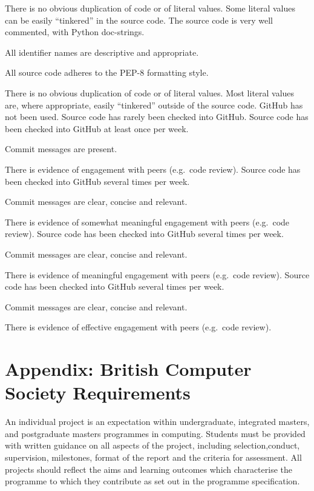 \documentclass{../fal_assignment}
\begin{document}
\begin{markingrubric}
\par There is no obvious duplication of code or of literal values. Some literal values can be easily ``tinkered'' in the source code. 
\grade The source code is very well commented, with Python doc-strings.
\par All identifier names are descriptive and appropriate.
\par All source code adheres to the PEP-8 formatting style.
\par There is no obvious duplication of code or of literal values. Most literal values are, where appropriate, easily ``tinkered'' outside of the source code.  	
		\grade\fail GitHub has not been used.
		\grade Source code has rarely been checked into GitHub.
		\grade Source code  has been checked into GitHub at least once per week.
			\par Commit messages are present.
			\par There is evidence of engagement with peers (e.g.\ code review).
		\grade Source code  has been checked into GitHub several times per week.
			\par Commit messages are clear, concise and relevant.
			\par There is evidence of somewhat meaningful engagement with peers (e.g.\ code review).
		\grade Source code has been checked into GitHub several times per week.
			\par Commit messages are clear, concise and relevant.
			\par There is evidence of meaningful engagement with peers (e.g.\ code review).
		\grade Source code has been checked into GitHub several times per week.
			\par Commit messages are clear, concise and relevant.
			\par There is evidence of effective engagement with peers (e.g.\ code review).
\end{markingrubric}

\section*{Appendix: British Computer Society Requirements}

An individual project is an expectation within undergraduate, integrated masters, and postgraduate masters programmes in computing. Students must be provided with written guidance on all aspects of the project, including selection,conduct, supervision, milestones, format of the report and the criteria for assessment. All projects should reflect the aims and learning outcomes which characterise the programme to which they contribute as set out in the programme specification.
\end{document}
